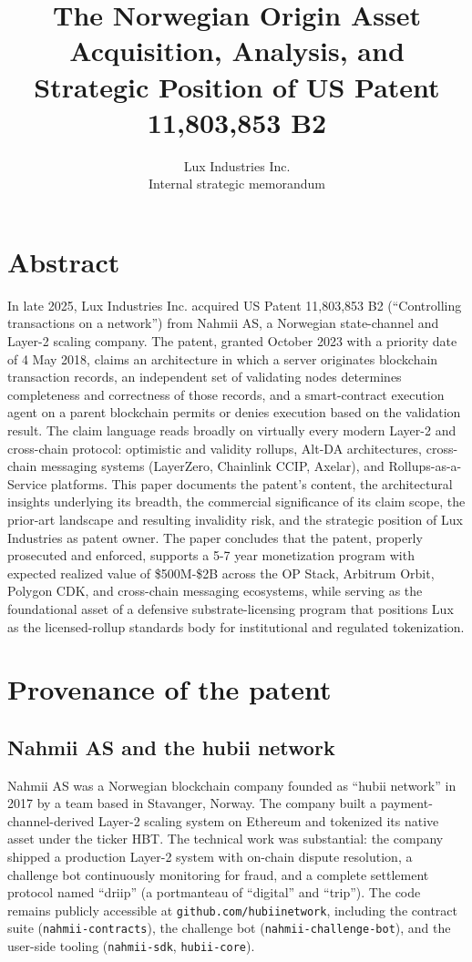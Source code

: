 \documentclass[11pt,letterpaper]{article}
\title{\textbf{The Norwegian Origin Asset}\\[6pt]
\large Acquisition, Analysis, and Strategic Position of US Patent 11{,}803{,}853 B2}
\author{Lux Industries Inc.\\[2pt]\small Internal strategic memorandum}
\date{}
\begin{document}
\luxcoverpage
\maketitle

\section*{Abstract}

In late 2025, Lux Industries Inc. acquired US Patent 11,803,853 B2 (``Controlling transactions on a network'') from Nahmii AS, a Norwegian state-channel and Layer-2 scaling company. The patent, granted October 2023 with a priority date of 4 May 2018, claims an architecture in which a server originates blockchain transaction records, an independent set of validating nodes determines completeness and correctness of those records, and a smart-contract execution agent on a parent blockchain permits or denies execution based on the validation result. The claim language reads broadly on virtually every modern Layer-2 and cross-chain protocol: optimistic and validity rollups, Alt-DA architectures, cross-chain messaging systems (LayerZero, Chainlink CCIP, Axelar), and Rollups-as-a-Service platforms. This paper documents the patent's content, the architectural insights underlying its breadth, the commercial significance of its claim scope, the prior-art landscape and resulting invalidity risk, and the strategic position of Lux Industries as patent owner. The paper concludes that the patent, properly prosecuted and enforced, supports a 5-7 year monetization program with expected realized value of \$500M-\$2B across the OP Stack, Arbitrum Orbit, Polygon CDK, and cross-chain messaging ecosystems, while serving as the foundational asset of a defensive substrate-licensing program that positions Lux as the licensed-rollup standards body for institutional and regulated tokenization.

\section{Provenance of the patent}

\subsection{Nahmii AS and the hubii network}

Nahmii AS was a Norwegian blockchain company founded as ``hubii network'' in 2017 by a team based in Stavanger, Norway. The company built a payment-channel-derived Layer-2 scaling system on Ethereum and tokenized its native asset under the ticker HBT. The technical work was substantial: the company shipped a production Layer-2 system with on-chain dispute resolution, a challenge bot continuously monitoring for fraud, and a complete settlement protocol named ``driip'' (a portmanteau of ``digital'' and ``trip''). The code remains publicly accessible at \texttt{github.com/hubiinetwork}, including the contract suite (\texttt{nahmii-contracts}), the challenge bot (\texttt{nahmii-challenge-bot}), and the user-side tooling (\texttt{nahmii-sdk}, \texttt{hubii-core}).
\end{document}
